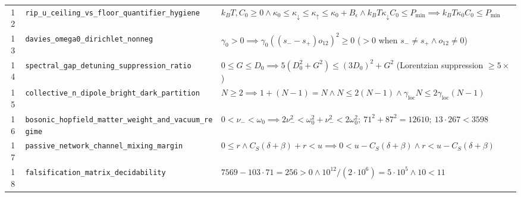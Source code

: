 \documentclass[10pt,twocolumn]{article}
\begin{document}
\begin{table}[t]
\begin{tabular}{@{}cll@{}}
12 & \texttt{rip\_u\_ceiling\_vs\_floor\_quantifier\_hygiene} & $k_BT,C_0\ge 0 \wedge \kappa_0\le\kappa_\downarrow\le\kappa_\uparrow\le\kappa_0+B_\epsilon \wedge k_BT\kappa_\downarrow C_0\le P_{\min} \implies k_BT\kappa_0 C_0\le P_{\min}$ \\
13 & \texttt{davies\_omega0\_dirichlet\_nonneg} & $\gamma_0>0 \implies \gamma_0((s_--s_+)o_{12})^2 \ge 0$ ($>0$ when $s_-\neq s_+ \wedge o_{12}\neq 0$) \\
14 & \texttt{spectral\_gap\_detuning\_suppression\_ratio} & $0\le G\le D_0 \implies 5(D_0^2+G^2) \le (3D_0)^2 + G^2$ (Lorentzian suppression $\ge 5\times$) \\
15 & \texttt{collective\_n\_dipole\_bright\_dark\_partition} & $N\ge 2 \implies 1+(N-1)=N \wedge N \le 2(N-1) \wedge \gamma_{\mathrm{loc}}N \le 2\gamma_{\mathrm{loc}}(N-1)$ \\
16 & \texttt{bosonic\_hopfield\_matter\_weight\_and\_vacuum\_regime} & $0<\nu_-<\omega_0 \implies 2\nu_-^2 < \omega_0^2+\nu_-^2 < 2\omega_0^2;\ 71^2+87^2=12610;\ 13\cdot 267<3598$ \\
17 & \texttt{passive\_network\_channel\_mixing\_margin} & $0\le r \wedge C_S(\delta+\beta)+r < u \implies 0 < u - C_S(\delta+\beta) \wedge r < u - C_S(\delta+\beta)$ \\
18 & \texttt{falsification\_matrix\_decidability} & $7569-103\cdot 71=256>0 \wedge 10^{12}/(2\cdot 10^6)=5\cdot 10^5 \wedge 10<11$ \\
\bottomrule
\end{tabular}
\end{table}
\end{document}
